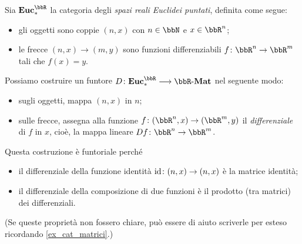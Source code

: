 \begin{example}\label{exa_derivata_funtore}
 Sia \(\ctEuc\) la categoria degli \emph{spazi reali Euclidei puntati}, definita come segue:
 \begin{itemize}
  \item gli oggetti sono coppie \((n,x)\) con \(n\in\bbN\) e \(x\in\bbR^n\);
  \item le frecce \((n,x)\to (m,y)\) sono funzioni differenziabili \(f\colon\bbR^n\to\bbR^m\) tali che \(f(x)=y\).
 \end{itemize}
 Possiamo costruire un funtore \(D\colon\ctEuc \fun \ctMat[\bbR]\) nel seguente modo:
 \begin{itemize}
  \item sugli oggetti, mappa \((n,x)\) in \(n\);
  \item sulle frecce, assegna alla funzione \(f\colon(\bbR^n,x)\to (\bbR^m,y)\) il \emph{differenziale} di \(f\) in \(x\), cioè, la mappa lineare \(Df\colon\bbR^n\to\bbR^m\).
 \end{itemize}
 Questa costruzione è funtoriale perché
 \begin{itemize}
  \item il differenziale della funzione identità \(\mathrm{id} \colon (n,x) \to (n,x)\) è la matrice identità;
  \item il differenziale della composizione di due funzioni è il prodotto (tra matrici) dei differenziali.
 \end{itemize}
 (Se queste proprietà non fossero chiare, può essere di aiuto scriverle per esteso ricordando \ref{ex_cat_matrici}.)
\end{example}

